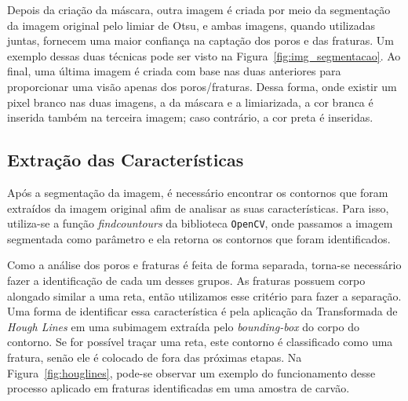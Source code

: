 \documentclass[a4paper,10pt,twocolumn,twoside]{article}
\begin{document}
Depois da criação da máscara, outra imagem é criada por meio da segmentação da imagem original pelo limiar de Otsu, e ambas imagens, quando utilizadas juntas, fornecem uma maior confiança na captação dos poros e das fraturas. Um exemplo dessas duas técnicas pode ser visto na Figura~\ref{fig:img_segmentacao}. Ao final, uma última imagem é criada com base nas duas anteriores para proporcionar uma visão apenas dos poros/fraturas. Dessa forma, onde existir um pixel branco nas duas imagens, a da máscara e a limiarizada, a cor branca é inserida também na terceira imagem; caso contrário, a cor preta é inseridas.

\subsection{Extração das Características}

Após a segmentação da imagem, é necessário encontrar os contornos que foram extraídos da imagem original afim de analisar as suas características. Para isso, utiliza-se a função \textit{findcountours} da biblioteca \texttt{OpenCV}, onde passamos a imagem segmentada como parâmetro e ela retorna os contornos que foram identificados.

Como a análise dos poros e fraturas é feita de forma separada, torna-se necessário fazer a identificação de cada um desses grupos. As fraturas possuem corpo alongado similar a uma reta, então utilizamos esse critério para fazer a separação. Uma forma de identificar essa característica é pela aplicação da Transformada de \textit{Hough Lines} em uma subimagem extraída pelo \textit{bounding-box} do corpo do contorno. Se for possível traçar uma reta, este contorno é classificado como uma fratura, senão ele é colocado de fora das próximas etapas. Na Figura~\ref{fig:houglines}, pode-se observar um exemplo do funcionamento desse processo aplicado em fraturas identificadas em uma amostra de carvão.
\end{document}
